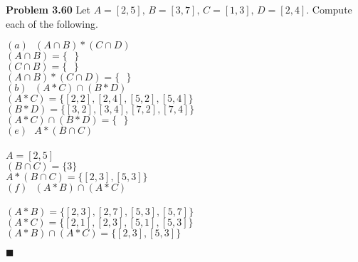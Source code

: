 \documentclass[12pt]{article}
\renewcommand{\qed}{\hfill$\blacksquare$}
\begin{document}

\noindent\textbf{Problem 3.60} Let $A = [2,5] \text{, } B = [3,7] \text{, }C = [1,3] \text{, }D = [2,4]$. Compute each of the following.\\
\begin{addmargin}[1em]{1em}

    \noindent$(a) \text{ }(A \cap B) * (C \cap D)$\\

    \noindent$(A \cap B) = \{ \text{ }\}$\\
    $(C \cap B) = \{ \text{ }\}$\\
    $(A \cap B) * (C \cap D) = \{\text{ } \}$\\
    
    \noindent$(b) \text{ }(A * C) \cap (B * D)$\\

    \noindent$(A * C) = \{[2,2],[2,4],[5,2],[5,4]\}$\\
    $(B * D) = \{[3,2],[3,4],[7,2],[7,4] \}$\\
    $(A * C) \cap (B * D) = \{\text{ }\}$\\
    
    \noindent$(e) \text{ }A * (B \cap C)$\\\\
    $A = [2,5]$\\
    $(B \cap C) = \{3\}$\\
    $A * (B \cap C) = \{ [2,3], [5,3]\}$\\

    \noindent$(f) \text{ }(A * B) \cap (A * C)$\\\\
    $(A * B) = \{[2,3],[2,7],[5,3],[5,7]\}$\\
    $(A * C) = \{[2,1],[2,3],[5,1],[5,3] \}$\\
    $(A * B) \cap (A * C) = \{[2,3],[5,3]\}$\\
    \begin{flushright}
    \qed
    \end{flushright}
\end{addmargin}
\end{document}
